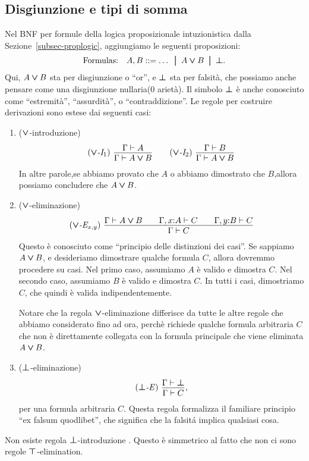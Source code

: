 \documentclass{article}
\begin{document}
\subsection{Disgiunzione e tipi di somma}

Nel BNF per formule della logica proposizionale intuzionistica dalla
Sezione~\ref{subsec-proplogic}, aggiungiamo le seguenti proposizioni:
\[ \mbox{Formulas:}\ssep A,B \bnf \ldots \bor A\cor B \bor \cfalse.
\]
Qui, $A\mathbin{\textrm{\rm\boldmath $\vee$}} B$ sta per disgiunzione o ``or'', e $\textrm{\rm\boldmath $\bot$}$
sta per falsit\`a, che possiamo anche pensare come una disgiunzione 
nullaria(0 ariet\`a). Il simbolo $\textrm{\rm\boldmath $\bot$}$ \`e anche conosciuto come
``estremit\`a'', ``assurdit\`a'', o ``contraddizione''.  Le regole per
costruire derivazioni sono estese dai seguenti casi:
\begin{enumerate}
	\resumeenumerate
	\item ($\mathbin{\textrm{\rm\boldmath $\vee$}}$-introduzione)
	\[ \trule{$\cor$-I$_1$}\ \deriv{\Gamma\tj A}{\Gamma\tj A\cor B}
	\sep
	\trule{$\cor$-I$_2$}\ \deriv{\Gamma\tj B}{\Gamma\tj A\cor B}
	\]
	In altre parole,se abbiamo provato che $A$ o abbiamo dimostrato che $B$,allora
	possiamo concludere che $A\mathbin{\textrm{\rm\boldmath $\vee$}} B$.
	\item ($\mathbin{\textrm{\rm\boldmath $\vee$}}$-eliminazione)
	\[ \trule{$\cor$-E$_{x,y}$}\ \deriv{\Gamma\tj A\cor B
		\sep \Gamma,\typ{x}{A}\tj C
		\sep \Gamma,\typ{y}{B}\tj C}{\Gamma\tj C}
	\]
	Questo \`e conosciuto come ``principio delle distinzioni dei casi''. Se sappiamo
	$A\mathbin{\textrm{\rm\boldmath $\vee$}} B$, e desideriamo dimostrare qualche formula $C$, allora dovremmo procedere
	su casi. Nel primo caso, assumiamo $A$ \`e valido e dimostra $C$. Nel
	secondo caso, assumiamo $B$ \`e valido e dimostra $C$. In tutti i casi, 
	dimostriamo $C$, che quindi \`e valida indipendentemente. 
	
	Notare che la regola $\mathbin{\textrm{\rm\boldmath $\vee$}}$-eliminazione differisce da tutte le altre regole che
	abbiamo considerato fino ad ora, perch\`e richiede qualche formula arbitraria $C$
	che non \`e direttamente collegata con la formula principale che viene eliminata $A\mathbin{\textrm{\rm\boldmath $\vee$}} B$.
	\item ($\textrm{\rm\boldmath $\bot$}$-eliminazione)
	\[ \trule{$\cfalse$-E}\ \deriv{\Gamma\tj\cfalse}{\Gamma\tj C},
	\]
	per una formula arbitraria $C$. Questa regola formalizza il familiare
	principio ``ex falsum quodlibet'', che significa che la falsit\'a 
	implica qualsiasi cosa.
\end{enumerate}

Non esiste regola $\textrm{\rm\boldmath $\bot$}$-introduzione . Questo \`e simmetrico al fatto 
che non ci sono regole $\textrm{\rm\boldmath $\top$}$-elimination.
\end{document}
